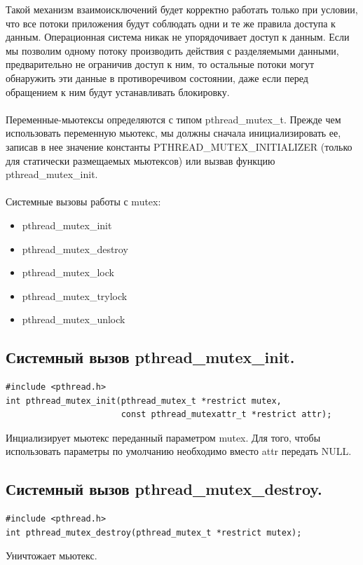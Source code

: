 \documentclass[a4paper]{article}
\begin{document}
Такой механизм взаимоисключений будет корректно работать только при условии, что все потоки приложения будут соблюдать одни и те же правила доступа к данным. Операционная система никак не упорядочивает доступ к данным. Если мы позволим одному потоку производить действия с разделяемыми данными, предварительно не ограничив доступ к ним, то остальные потоки могут обнаружить эти данные в противоречивом состоянии, даже если перед обращением к ним будут устанавливать блокировку.\\\\
Переменные-мьютексы определяются с типом pthread\_mutex\_t. Прежде чем использовать переменную мьютекс, мы должны сначала инициализировать ее, записав в нее значение константы PTHREAD\_MUTEX\_INITIALIZER (только для статически размещаемых мьютексов) или вызвав функцию pthread\_mutex\_init.\\\\
Системные вызовы работы с mutex:
\begin{itemize}
  \item pthread\_mutex\_init
  \item pthread\_mutex\_destroy
  \item pthread\_mutex\_lock
  \item pthread\_mutex\_trylock
  \item pthread\_mutex\_unlock
\end{itemize}

\subsection{\Large Системный вызов pthread\_mutex\_init.}
\begin{verbatim}
#include <pthread.h>
int pthread_mutex_init(pthread_mutex_t *restrict mutex, 
                       const pthread_mutexattr_t *restrict attr);
\end{verbatim}
Инциализирует мьютекс переданный параметром mutex. Для того, чтобы использовать параметры по умолчанию необходимо вместо attr передать NULL.

\subsection{\Large Системный вызов pthread\_mutex\_destroy.}
\begin{verbatim}
#include <pthread.h>
int pthread_mutex_destroy(pthread_mutex_t *restrict mutex);
\end{verbatim}
Уничтожает мьютекс.
\end{document}
